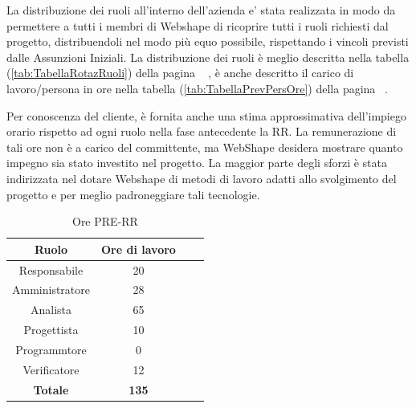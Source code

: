 La distribuzione dei ruoli all'interno dell'azienda e' stata realizzata in modo da permettere a tutti i membri di Webshape di ricoprire tutti i ruoli richiesti dal progetto, distribuendoli nel modo pi\`u equo possibile, rispettando i vincoli previsti dalle Assunzioni Iniziali. La distribuzione dei ruoli \`e meglio descritta nella tabella (\ref{tab:TabellaRotazRuoli}) della pagina ~\pageref{tab:TabellaRotazRuoli} , \`e anche descritto il carico di lavoro/persona in ore nella tabella (\ref{tab:TabellaPrevPersOre}) della pagina ~\pageref{tab:TabellaPrevPersOre}.

Per conoscenza del cliente, \`e fornita anche una stima approssimativa dell'impiego orario rispetto ad ogni ruolo nella fase antecedente la RR. La remunerazione di tali ore non \`e a carico del committente, ma WebShape desidera mostrare quanto impegno sia stato investito nel progetto. La maggior parte degli sforzi \`e stata indirizzata nel dotare Webshape di metodi di lavoro adatti allo svolgimento del progetto e per meglio padroneggiare tali tecnologie.\\

\begin{table}[h]
	\begin{center}
		  \begin{tabular}{|c|c|c|c|}
		 \hline 
		 \textbf{Ruolo} & \textbf{Ore di lavoro} \\
		 \hline
		Responsabile & 20 \\
		Amministratore & 28 \\
		Analista & 65 \\
		Progettista & 10 \\
		Programmtore & 0 \\
		Verificatore & 12 \\
        \hline
        \textbf{Totale} & \textbf{135} \\
		\hline
		\end{tabular}
	\caption{Ore PRE-RR} 
	\label{tab:tabella_PRE_RR}
	\end{center}	
\end{table}

\newpage


